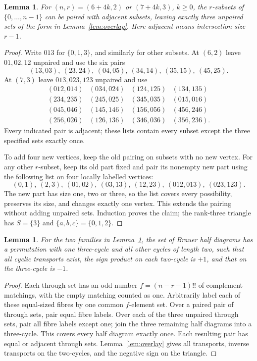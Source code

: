 \documentclass[11pt,a4paper]{article}
\newtheorem{lemma}[theorem]{Lemma}
\begin{document}
\begin{lemma}\label{lem:subset}
For $(n,r)=(6+4k,2)$ or $(7+4k,3)$, $k\ge0$, the $r$-subsets of $\{0,\ldots,n-1\}$ can be paired with adjacent subsets, leaving exactly three unpaired sets of the form in Lemma~\ref{lem:overlay}. Here adjacent means intersection size $r-1$.
\end{lemma}
\begin{proof}
Write $013$ for $\{0,1,3\}$, and similarly for other subsets. At $(6,2)$ leave $01,02,12$ unpaired and use the six pairs
\[
 (13,03),\ (23,24),\ (04,05),\ (34,14),\ (35,15),\ (45,25).
\]
At $(7,3)$ leave $013,023,123$ unpaired and use
\[
\begin{array}{llll}
(012,014)&(034,024)&(124,125)&(134,135)\\
(234,235)&(245,025)&(345,035)&(015,016)\\
(045,046)&(145,146)&(156,056)&(456,246)\\
(256,026)&(126,136)&(346,036)&(356,236).
\end{array}
\]
Every indicated pair is adjacent; these lists contain every subset except the three specified sets exactly once.

To add four new vertices, keep the old pairing on subsets with no new vertex. For any other $r$-subset, keep its old part fixed and pair its nonempty new part using the following list on four locally labelled vertices:
\[
 (0,1),\ (2,3),\ (01,02),\ (03,13),\ (12,23),\
 (012,013),\ (023,123).
\]
The new part has size one, two or three, so the list covers every possibility, preserves its size, and changes exactly one vertex. This extends the pairing without adding unpaired sets. Induction proves the claim; the rank-three triangle has $S=\{3\}$ and $\{a,b,c\}=\{0,1,2\}$.
\end{proof}

\begin{lemma}\label{lem:half}
For the two families in Lemma~\ref{lem:subset}, the set of Brauer half diagrams has a permutation with one three-cycle and all other cycles of length two, such that all cyclic transports exist, the sign product on each two-cycle is $+1$, and that on the three-cycle is $-1$.
\end{lemma}
\begin{proof}
Each through set has an odd number $f=(n-r-1)!!$ of complement matchings, with the empty matching counted as one. Arbitrarily label each of these equal-sized fibres by one common $f$-element set. Over a paired pair of through sets, pair equal fibre labels. Over each of the three unpaired through sets, pair all fibre labels except one; join the three remaining half diagrams into a three-cycle. This covers every half diagram exactly once. Each resulting pair has equal or adjacent through sets. Lemma~\ref{lem:overlay} gives all transports, inverse transports on the two-cycles, and the negative sign on the triangle.
\end{proof}
\end{document}
